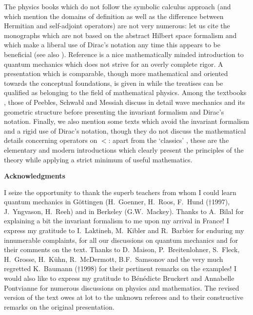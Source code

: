 \documentclass[a4wide,12pt]{report}
\begin{document}
The physics books which do not follow the symbolic calculus approach 
(and which mention the domains of definition as well as the difference 
between Hermitian and self-adjoint operators) are not very numerous:
let us cite the monographs \cite{gap} 
which are not based on the abstract Hilbert space  
formalism and which make a
liberal use of Dirac's notation any time this 
appears to be beneficial
(see also \cite{bal, sche}). 
Reference \cite{mue} is a 
nice mathematically minded introduction 
to quantum mechanics which  does not 
strive for an overly complete  rigor.
A presentation  which is comparable, though more mathematical 
and oriented towards the conceptual foundations, is given in 
\cite{jmj} while the treatises
\cite{ber,th,rj,gl}
can be qualified as belonging to the field of mathematical physics. 
Among the textbooks \cite{ct}, those of Peebles, Schwabl and
Messiah  discuss 
in detail wave mechanics and its geometric structure before presenting 
the invariant formalism and Dirac's notation. 
Finally, we also mention some texts which avoid the 
invariant formalism and a rigid use of Dirac's notation, 
though they do not discuss the mathematical details concerning 
operators on 
$\lt$: apart from the `classics' \cite{ll}, these are the elementary and
modern introductions \cite{pd} which clearly present the principles of the
theory while applying a strict minimum of useful mathematics. 


 
 
 
\vspace{14mm}
 
{\bf \Large Acknowledgments}
 
\vspace{5mm}
 
I seize the opportunity to thank the superb teachers from whom 
I could learn quantum mechanics in
G\"ottingen (H.~Goenner, H.~Roos, F.~Hund ($\dagger$1997),
J.~Yngvason, H.~Reeh) and in Berkeley (G.W.~Mackey).
Thanks to A.~Bilal for explaining a bit the invariant formalism 
to me upon my arrival in France! 
I express my gratitude to I.~Laktineh, M.~Kibler
and R.~Barbier for enduring my innumerable complaints, 
for all our discussions on quantum mechanics and for their 
comments on the text. 
Thanks to D.~Maison, P.~Breitenlohner, S.~Fleck, 
H.~Grosse, H.~K\"uhn,
R.~McDermott, B.F.~Samsonov and the very much 
regretted K.~Baumann ($\dagger$1998) 
for their pertinent remarks on the examples!
I would also like to express my gratitude to 
B\'en\'edicte Bruckert and Annabelle
Pontvianne for numerous discussions on physics and 
mathematics. The revised version of the text 
owes at lot to the unknown referees and to their 
constructive remarks on the original presentation.  
\end{document}
